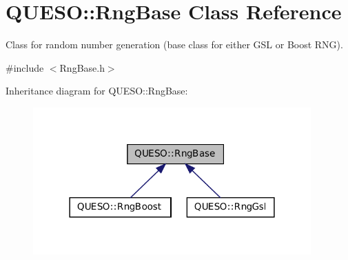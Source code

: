 \hypertarget{class_q_u_e_s_o_1_1_rng_base}{\section{Q\-U\-E\-S\-O\-:\-:Rng\-Base Class Reference}
\label{class_q_u_e_s_o_1_1_rng_base}
}


Class for random number generation (base class for either G\-S\-L or Boost R\-N\-G).  




{\ttfamily \#include $<$Rng\-Base.\-h$>$}



Inheritance diagram for Q\-U\-E\-S\-O\-:\-:Rng\-Base\-:
\nopagebreak
\begin{figure}[H]
\begin{center}
\leavevmode
\includegraphics[width=302pt]{class_q_u_e_s_o_1_1_rng_base__inherit__graph}
\end{center}
\end{figure}
